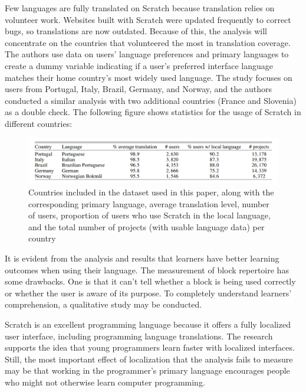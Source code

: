 Few languages are fully translated on Scratch because translation relies on volunteer work. Websites built with Scratch were updated frequently to correct bugs, so translations are now outdated. Because of this, the analysis will concentrate on the countries that volunteered the most in translation coverage. The authors use data on users' language preferences and primary languages to create a dummy variable indicating if a user's preferred interface language matches their home country's most widely used language. The study focuses on users from Portugal, Italy, Brazil, Germany, and Norway, and the authors conducted a similar analysis with two additional countries (France and Slovenia) as a double check. The following figure shows statistics for the usage of Scratch in different countries:

\begin{figure}[H]
\includegraphics[width=15cm]{ch2-images/scratch2.png}
\caption{Countries included in the dataset used in this paper, along with the corresponding primary language, average translation level, number of users, proportion of users who use Scratch in the local language, and the total number of projects (with usable language data) per country \cite{dasgupta2017learning}}
\label{fig:Statistics for Usage of Scratch in Different Countries}
\end{figure} 

It is evident from the analysis and results that learners have better learning outcomes when using their language. The measurement of block repertoire has some drawbacks. One is that it can't tell whether a block is being used correctly or whether the user is aware of its purpose. To completely understand learners' comprehension, a qualitative study may be conducted.

Scratch is an excellent programming language because it offers a fully localized user interface, including programming language translations. The research supports the idea that young programmers learn faster with localized interfaces. Still, the most important effect of localization that the analysis fails to measure may be that working in the programmer's primary language encourages people who might not otherwise learn computer programming.
